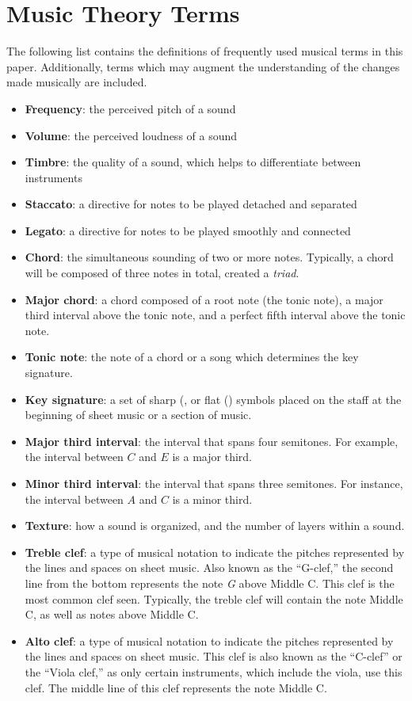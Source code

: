 \chapter{Music Theory Terms}\label{appendix:music-theory-terms}
The following list contains the definitions of frequently used musical terms in this paper. Additionally, terms which may augment the understanding of the changes made musically are included. 
\begin{itemize}
    \item {\textbf{Frequency}: the perceived pitch of a sound}
    \item {\textbf{Volume}: the perceived loudness of a sound}
    \item {\textbf{Timbre}: the quality of a sound, which helps to differentiate between instruments}
    \item {\textbf{Staccato}: a directive for notes to be played detached and separated}
    \item {\textbf{Legato}: a directive for notes to be played smoothly and connected}
    \item {\textbf{Chord}: the simultaneous sounding of two or more notes. Typically, a chord will be composed of three notes in total, created a \textit{triad}.}
    \item {\textbf{Major chord}: a chord composed of a root note (the tonic note), a major third interval above the tonic note, and a perfect fifth interval above the tonic note.}
    \item {\textbf{Tonic note}: the note of a chord or a song which determines the key signature.}
    \item {\textbf{Key signature}: a set of sharp (\musSharp{}, or flat (\musFlat{}) symbols placed on the staff at the beginning of sheet music or a section of music.}
    \item {\textbf{Major third interval}: the interval that spans four semitones. For example, the interval between $C$ and $E$ is a major third.}
    \item {\textbf{Minor third interval}: the interval that spans three semitones. For instance, the interval between $A$ and $C$ is a minor third.}
    \item {\textbf{Texture}: how a sound is organized, and the number of layers within a sound.}
    \item {\textbf{Treble clef}: a type of musical notation to indicate the pitches represented by the lines and spaces on sheet music. Also known as the ``G-clef,'' the second line from the bottom represents the note \textit{G} above Middle C. This clef is the most common clef seen. Typically, the treble clef will contain the note Middle C, as well as notes above Middle C.}
    \item {\textbf{Alto clef}: a type of musical notation to indicate the pitches represented by the lines and spaces on sheet music. This clef is also known as the ``C-clef'' or the ``Viola clef,'' as only certain instruments, which include the viola, use this clef. The middle line of this clef represents the note Middle C.}
\end{itemize}